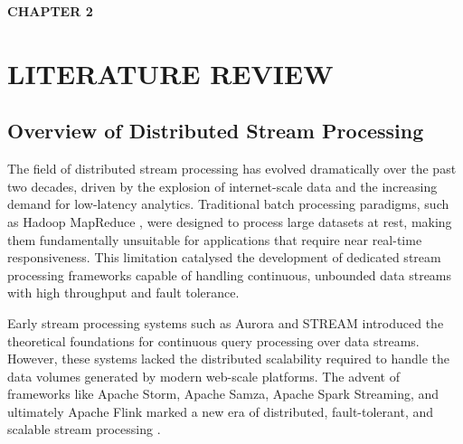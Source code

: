 \newpage
\textbf{\huge CHAPTER  2}\\
\section{LITERATURE REVIEW} \setcounter{section}{2}
\subsection{Overview of Distributed Stream Processing}\setcounter{subsection}{1}

\begin{justify}
    The field of distributed stream processing has evolved dramatically over the past two decades, driven by the explosion of internet-scale data and the increasing demand for low-latency analytics. Traditional batch processing paradigms, such as Hadoop MapReduce \cite{[1]}, were designed to process large datasets at rest, making them fundamentally unsuitable for applications that require near real-time responsiveness. This limitation catalysed the development of dedicated stream processing frameworks capable of handling continuous, unbounded data streams with high throughput and fault tolerance.

    Early stream processing systems such as Aurora \cite{[2]} and STREAM \cite{[3]} introduced the theoretical foundations for continuous query processing over data streams. However, these systems lacked the distributed scalability required to handle the data volumes generated by modern web-scale platforms. The advent of frameworks like Apache Storm, Apache Samza, Apache Spark Streaming, and ultimately Apache Flink marked a new era of distributed, fault-tolerant, and scalable stream processing \cite{[4]}.
\end{justify}

\vspace{0.25cm}

